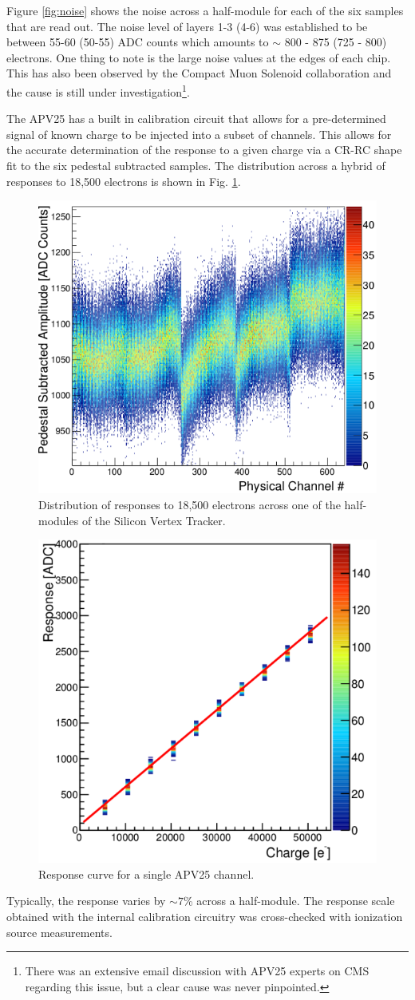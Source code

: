 Figure \ref{fig:noise} shows the noise across a half-module for each of the 
six samples that are read out.
The noise level of layers 1-3 (4-6) was established
to be between 55-60 (50-55) ADC counts which amounts to $\sim$ 800 - 875 (725 - 800) 
electrons. One thing to note is the large noise values at
the edges of each chip.  This has also been observed by the Compact Muon
Solenoid collaboration
and the cause is still under investigation\footnote{There was an extensive email
discussion with APV25 experts on CMS regarding this issue, but a clear cause was never
pinpointed.}. 

The APV25 has a built in calibration circuit that allows for a 
pre-determined signal of known charge to be injected into a subset of channels.
This allows for the accurate determination of the response to a given charge 
via a CR-RC shape fit
to the six pedestal subtracted samples.  The distribution across a hybrid 
of responses to 18,500 electrons is shown in Fig. \ref{fig:response}.
\begin{figure}[h!t]
    \centering
    \includegraphics[width=.6\textwidth]{images/response.png}
    \caption{Distribution of responses to 18,500 electrons across one of the 
             half-modules of the Silicon Vertex Tracker.}
    \label{fig:response}
\end{figure}
\begin{figure}[h!b]
    \centering
    \includegraphics[width=.6\textwidth]{images/response_curve.png}
    \caption{Response curve for a single APV25 channel.}
    \label{fig:response_curve}
\end{figure}
Typically, the response varies by $\sim 7$\% across a half-module. 
The response scale obtained with
the internal calibration circuitry was cross-checked with ionization source
measurements.  

